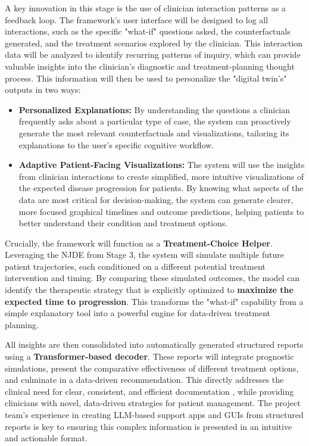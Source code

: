 \documentclass[11pt, a4paper]{article}
\begin{document}
A key innovation in this stage is the use of clinician interaction patterns as a feedback loop. The framework's user interface will be designed to log all interactions, such as the specific "what-if" questions asked, the counterfactuals generated, and the treatment scenarios explored by the clinician. This interaction data will be analyzed to identify recurring patterns of inquiry, which can provide valuable insights into the clinician's diagnostic and treatment-planning thought process. This information will then be used to personalize the "digital twin's" outputs in two ways:
\begin{itemize}
    \item \textbf{Personalized Explanations:} By understanding the questions a clinician frequently asks about a particular type of case, the system can proactively generate the most relevant counterfactuals and visualizations, tailoring its explanations to the user's specific cognitive workflow.
    \item \textbf{Adaptive Patient-Facing Visualizations:} The system will use the insights from clinician interactions to create simplified, more intuitive visualizations of the expected disease progression for patients. By knowing what aspects of the data are most critical for decision-making, the system can generate clearer, more focused graphical timelines and outcome predictions, helping patients to better understand their condition and treatment options.
\end{itemize}

Crucially, the framework will function as a \textbf{Treatment-Choice Helper}. Leveraging the NJDE from Stage 3, the system will simulate multiple future patient trajectories, each conditioned on a different potential treatment intervention and timing. By comparing these simulated outcomes, the model can identify the therapeutic strategy that is explicitly optimized to \textbf{maximize the expected time to progression}. This transforms the "what-if" capability from a simple explanatory tool into a powerful engine for data-driven treatment planning.

All insights are then consolidated into automatically generated structured reports using a \textbf{Transformer-based decoder}. These reports will integrate prognostic simulations, present the comparative effectiveness of different treatment options, and culminate in a data-driven recommendation. This directly addresses the clinical need for clear, consistent, and efficient documentation \cite{JorgHalfmann2023, SacoranskyKwan2024}, while providing clinicians with novel, data-driven strategies for patient management. The project team's experience in creating LLM-based support apps and GUIs from structured reports is key to ensuring this complex information is presented in an intuitive and actionable format.
\end{document}
